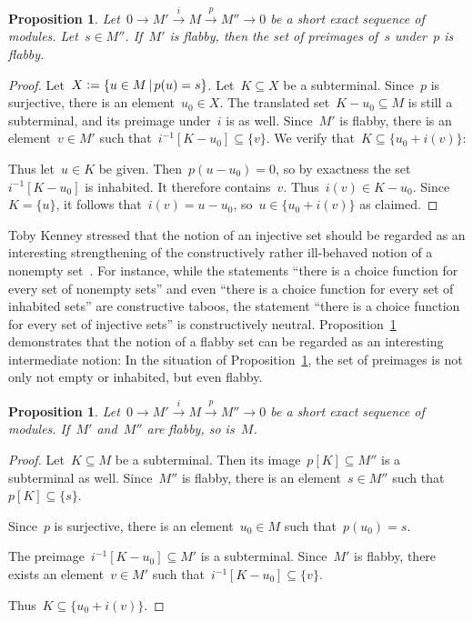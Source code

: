 \documentclass[oneside]{amsart}
\theoremstyle{definition}
\theoremstyle{plain}
\newtheorem{prop}[defn]{Proposition}
\theoremstyle{remark}
\newcommand{\xra}[1]{\xrightarrow{#1}}
\newcommand{\defeq}{\vcentcolon=}
\renewcommand{\_}{\mathpunct{.}\,}
\begin{document}
\begin{prop}\label{prop:set-of-preimages-flabby}
Let~$0 \to M' \xra{i} M \xra{p} M'' \to 0$ be a short exact
sequence of modules. Let~$s \in M''$. If~$M'$ is flabby, then the set of
preimages of~$s$ under~$p$ is flabby.
\end{prop}

\begin{proof}Let~$X \defeq \{ u \in M \,|\, p(u) = s
\}$. Let~$K \subseteq X$ be a subterminal. Since~$p$ is surjective, there is an
element~$u_0 \in X$. The translated set~$K - u_0 \subseteq M$ is still a
subterminal, and its preimage under~$i$ is as well. Since~$M'$ is flabby, there
is an element~$v \in M'$ such that~$i^{-1}[K - u_0] \subseteq \{v\}$. We verify
that~$K \subseteq \{u_0 + i(v)\}$:

Thus let~$u \in K$ be given. Then~$p(u - u_0) = 0$, so by exactness the
set~$i^{-1}[K - u_0]$ is inhabited. It therefore contains~$v$. Thus~$i(v) \in K
- u_0$. Since~$K = \{u\}$, it follows that~$i(v) = u - u_0$, so~$u \in \{u_0 +
i(v)\}$ as claimed.
\end{proof}

Toby Kenney stressed that the notion of an injective set should be regarded as an
interesting strengthening of the constructively rather ill-behaved notion of a
nonempty set~\cite{kenney:injective-choice}. For instance, while the statements
``there is a choice function for every set of nonempty sets'' and even ``there
is a choice function for every set of inhabited sets'' are constructive taboos,
the statement ``there is a choice function for every set of injective sets'' is
constructively neutral. Proposition~\ref{prop:set-of-preimages-flabby} demonstrates
that the notion of a flabby set can be regarded as an interesting intermediate
notion: In the situation of Proposition~\ref{prop:set-of-preimages-flabby}, the
set of preimages is not only not empty or inhabited, but even flabby.

\begin{prop}Let~$0 \to M' \xra{i} M \xra{p} M'' \to 0$ be a short exact
sequence of modules. If~$M'$ and~$M''$ are flabby, so is~$M$.
\end{prop}

\begin{proof}Let~$K \subseteq M$ be a subterminal. Then its image~$p[K] \subseteq M''$
is a subterminal as well. Since~$M''$ is flabby, there is an element~$s \in
M''$ such that~$p[K] \subseteq \{ s \}$.

Since~$p$ is surjective, there is an element~$u_0 \in M$ such that~$p(u_0) =
s$.

The preimage~$i^{-1}[K - u_0] \subseteq M'$ is a subterminal. Since~$M'$ is
flabby, there exists an element~$v \in M'$ such that~$i^{-1}[K - u_0] \subseteq
\{v\}$.

Thus~$K \subseteq \{ u_0 + i(v) \}$.
\end{proof}
\end{document}
